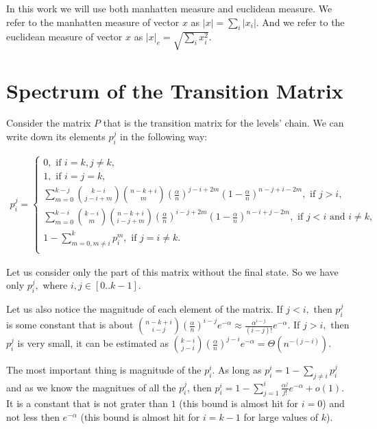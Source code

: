 \documentclass{article}
\begin{document}
In this work we will use both manhatten measure and euclidean measure. We refer to the manhatten measure of vector $x$ as $|x| = \sum\limits_{i} |x_i|.$ And we refer to the euclidean measure of vector $x$ as $|x|_e = \sqrt{\sum\limits_i x_i^2}.$

\section{Spectrum of the Transition Matrix}

Consider the matrix $P$ that is the transition matrix for the levels' chain. We can write down its elements $p_i^j$ in the following way:

\begin{align*}
  p_i^j = \begin{cases}
    0, \text{ if } i = k, j \ne k, \\
    1, \text{ if } i = j = k, \\
    \sum\limits_{m = 0}^{k - j} \binom{k - i}{j - i + m} \binom{n - k + i}{m} \left(\frac{\alpha}{n}\right)^{j - i + 2m} \left(1 - \frac{\alpha}{n}\right)^{n - j + i - 2m}, \text{ if } j > i, \\
      \sum\limits_{m = 0}^{k - i} \binom{k - i}{m} \binom{n - k + i}{i - j + m} \left(\frac{\alpha}{n}\right)^{i - j + 2m} \left(1 - \frac{\alpha}{n}\right)^{n - i + j - 2m}, \text{ if } j < i \text{ and } i \ne k, \\
      1 - \sum\limits_{m = 0, m \ne i}^k p_i^m, \text{ if } j = i \ne k. \\
  \end{cases}
\end{align*}

Let us consider only the part of this matrix without the final state. So we have only $p_i^j,$ where $i, j \in [0..k-1].$

Let us also notice the magnitude of each element of the matrix. If $j < i,$ then $p_i^j$ is some constant that is about $\binom{n - k + i}{i - j}\left(\frac{\alpha}{n}\right)^{i - j}e^{-\alpha} \approx \frac{\alpha^{i - j}}{(i - j)!} e^{-\alpha}.$ If $j > i,$ then $p_i^j$ is very small, it can be estimated as $\binom{k - i}{j - i}\left(\frac{\alpha}{n}\right)^{j - i}e^{-\alpha} = \Theta(n^{-(j - i)}).$

The most important thing is magnitude of the $p_i^i.$ As long as $p_i^i = 1 - \sum\limits_{j \ne i} p_i^j$ and as we know the magnitues of all the $p_i^j$, then $p_i^i = 1 - \sum\limits_{j = 1}^{i} \frac{\alpha^j}{j!}e^{-\alpha} + o(1).$  It is a constant that is not grater than $1$ (this bound is almost hit for $i = 0$) and not less then $e^{-\alpha}$ (this bound is almost hit for $i = k - 1$ for large values of $k$).
\end{document}
